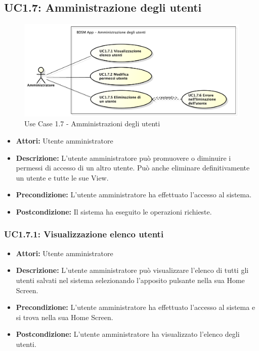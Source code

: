 \clearpage


\subsection{UC1.7: Amministrazione degli utenti}

\begin{figure}[!htbp]
    \centering
    \centerline{\includegraphics[scale=0.45]{./images/UC1_7.pdf}}
    \caption{Use Case 1.7 - Amministrazioni degli utenti}
\end{figure}

\begin{itemize}
    \item \textbf{Attori:} Utente amministratore
    \item \textbf{Descrizione:} L'utente amministratore può promuovere o diminuire i permessi di accesso di un altro utente. Può anche eliminare definitivamente un utente e tutte le sue View.
    \item \textbf{Precondizione:} L'utente amministratore ha effettuato l'accesso al sistema.
    \item \textbf{Postcondizione:} Il sistema ha eseguito le operazioni richieste.
\end{itemize}

\subsubsection{UC1.7.1: Visualizzazione elenco utenti}

\begin{itemize}
    \item \textbf{Attori:} Utente amministratore
    \item \textbf{Descrizione:} L'utente amministratore può visualizzare l'elenco di tutti gli utenti salvati nel sistema selezionando l'apposito pulsante nella sua Home Screen.
    \item \textbf{Precondizione:} L'utente amministratore ha effettuato l'accesso al sistema e si trova nella sua Home Screen.
    \item \textbf{Postcondizione:} L'utente amministratore ha visualizzato l'elenco degli utenti.
\end{itemize}

